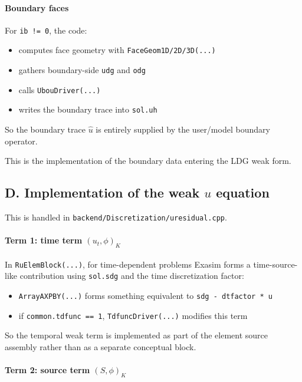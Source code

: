 \documentclass[11pt]{article}
\begin{document}
\paragraph{Boundary faces}

For \texttt{ib != 0}, the code:

\begin{itemize}[leftmargin=*]
\item computes face geometry with \texttt{FaceGeom1D/2D/3D(...)}
\item gathers boundary-side \texttt{udg} and \texttt{odg}
\item calls \texttt{UbouDriver(...)}
\item writes the boundary trace into \texttt{sol.uh}
\end{itemize}

So the boundary trace $\hat{u}$ is entirely supplied by the user/model
boundary operator.

This is the implementation of the boundary data entering the LDG weak form.

\subsection*{D. Implementation of the weak $u$ equation}

This is handled in \texttt{backend/Discretization/uresidual.cpp}.

\paragraph{Term 1: time term $(u_t, \phi)_K$}

In \texttt{RuElemBlock(...)}, for time-dependent problems Exasim forms a
time-source-like contribution using \texttt{sol.sdg} and the time
discretization factor:

\begin{itemize}[leftmargin=*]
\item \texttt{ArrayAXPBY(...)} forms something equivalent to
\texttt{sdg - dtfactor * u}
\item if \texttt{common.tdfunc == 1}, \texttt{TdfuncDriver(...)} modifies this
term
\end{itemize}

So the temporal weak term is implemented as part of the element source
assembly rather than as a separate conceptual block.

\paragraph{Term 2: source term $(S, \phi)_K$}
\end{document}
